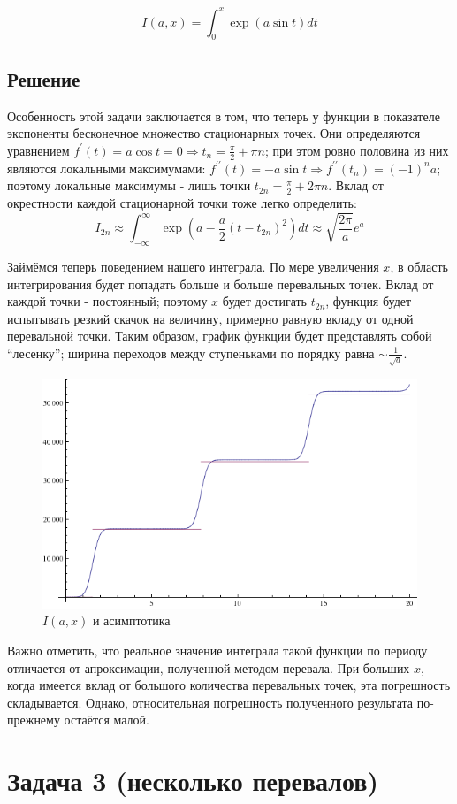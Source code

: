 \documentclass[a4paper,12pt]{article}
\begin{document}
\[
I(a,x)=\int_{0}^{x}\exp(a\sin t)dt
\]


\subsection*{Решение}

Особенность этой задачи заключается в том, что теперь у функции в
показателе экспоненты бесконечное множество стационарных точек. Они
определяются уравнением $f^{\prime}(t)=a\cos t=0\Rightarrow t_{n}=\frac{\pi}{2}+\pi n$;
при этом ровно половина из них являются локальными максимумами: $f^{\prime\prime}(t)=-a\sin t\Rightarrow f^{\prime\prime}(t_{n})=\left(-1\right)^{n}a$;
поэтому локальные максимумы - лишь точки $t_{2n}=\frac{\pi}{2}+2\pi n$.
Вклад от окрестности каждой стационарной точки тоже легко определить:
\[
I_{2n}\approx\int_{-\infty}^{\infty}\exp(a-\frac{a}{2}(t-t_{2n})^{2})dt\approx\sqrt{\frac{2\pi}{a}}e^{a}
\]

\noindent
Займёмся теперь поведением нашего интеграла. По мере увеличения $x$,
в область интегрирования будет попадать больше и больше перевальных
точек. Вклад от каждой точки - постоянный; поэтому $x$ будет достигать
$t_{2n}$, функция будет испытывать резкий скачок на величину, примерно
равную вкладу от одной перевальной точки. Таким образом, график функции
будет представлять собой ``лесенку''; ширина переходов между ступеньками по порядку равна
 $\sim\frac{1}{\sqrt{a}}$.

\begin{figure}[h]
	\caption{$I(a,x)$ и асимптотика}
	\centering
	\includegraphics[width=0.5\columnwidth]{ladder.png}
\end{figure}

\noindent
Важно отметить, что реальное значение интеграла
такой функции по периоду отличается от апроксимации, полученной методом
перевала. При больших $x$, когда имеется вклад от большого количества
перевальных точек, эта погрешность складывается. Однако, относительная погрешность полученного результата по-прежнему остаётся малой.

\section*{Задача 3 (несколько перевалов)}
\end{document}
